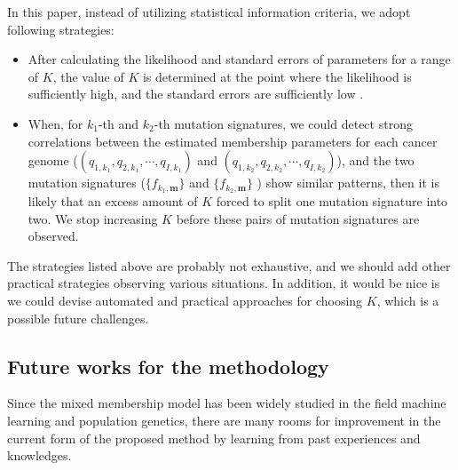In this paper, instead of utilizing statistical information criteria,
we adopt following strategies:

\begin{itemize}
\item
After calculating the likelihood and standard errors of parameters for a range of $K$,
the value of $K$ is determined at the point where the likelihood is sufficiently high, 
and the standard errors are sufficiently low \cite{pmid23318258}.

\item
When, for $k_1$-th and $k_2$-th mutation signatures, 
we could detect strong correlations between the estimated membership parameters 
for each cancer genome
($(q_{1,k_1}, q_{2,k_1}, \cdots, q_{I,k_1})$ and $(q_{1,k_2}, q_{2,k_2}, \cdots, q_{I,k_2})$),
and the two mutation signatures ($\{ f_{k_1, \bm{m} } \}$ and $\{ f_{k_2, \bm{m} } \}$ ) show similar patterns,
then it is likely that an excess amount of $K$ forced to split one mutation signature into two.
We stop increasing $K$ before these pairs of mutation signatures are observed.

\end{itemize}

The strategies listed above are probably not exhaustive, 
and we should add other practical strategies observing various situations.
In addition, it would be nice is we could devise automated and practical approaches for choosing $K$,
which is a possible future challenges.


\subsection*{Future works for the methodology}



Since the mixed membership model has been widely studied in the field machine learning and population genetics,
there are many rooms for improvement in the current form of the proposed method by learning from past experiences and knowledges.

